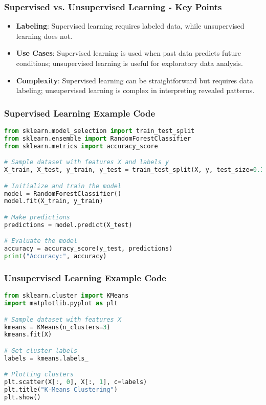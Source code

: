 \documentclass[aspectratio=169]{beamer}
\begin{document}
\begin{frame}[fragile]
  \frametitle{Supervised vs. Unsupervised Learning - Key Points}
  \begin{itemize}
    \item \textbf{Labeling}: Supervised learning requires labeled data, while unsupervised learning does not.
    \item \textbf{Use Cases}: Supervised learning is used when past data predicts future conditions; unsupervised learning is useful for exploratory data analysis.
    \item \textbf{Complexity}: Supervised learning can be straightforward but requires data labeling; unsupervised learning is complex in interpreting revealed patterns.
  \end{itemize}
\end{frame}

\begin{frame}[fragile]
  \frametitle{Supervised Learning Example Code}
  \begin{lstlisting}[language=Python]
from sklearn.model_selection import train_test_split
from sklearn.ensemble import RandomForestClassifier
from sklearn.metrics import accuracy_score

# Sample dataset with features X and labels y
X_train, X_test, y_train, y_test = train_test_split(X, y, test_size=0.3)

# Initialize and train the model
model = RandomForestClassifier()
model.fit(X_train, y_train)

# Make predictions
predictions = model.predict(X_test)

# Evaluate the model
accuracy = accuracy_score(y_test, predictions)
print("Accuracy:", accuracy)
  \end{lstlisting}
\end{frame}

\begin{frame}[fragile]
  \frametitle{Unsupervised Learning Example Code}
  \begin{lstlisting}[language=Python]
from sklearn.cluster import KMeans
import matplotlib.pyplot as plt

# Sample dataset with features X
kmeans = KMeans(n_clusters=3)
kmeans.fit(X)

# Get cluster labels
labels = kmeans.labels_

# Plotting clusters
plt.scatter(X[:, 0], X[:, 1], c=labels)
plt.title("K-Means Clustering")
plt.show()
  \end{lstlisting}
\end{frame}
\end{document}
